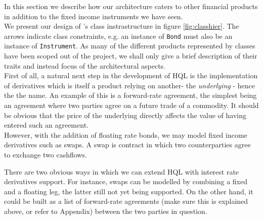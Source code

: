 In this section we describe how our architecture caters to other financial 
products in addition to the fixed income instruments we have seen.\\

We present our design of \hql's class instrastructure in figure \ref{fig:classhier}.
The arrows indicate class constraints, e.g. an instance of \texttt{Bond}
must also be an instance of \texttt{Instrument}. As many of the different
products represented by classes have been scoped out of the project, we shall only
give a brief description of their traits and instead focus of the architectural
aspects.\\

First of all, a natural next step in the development of HQL is the 
implementation of derivatives which is itself a product relying on another- the 
\emph{underlying} - hence the the name. An example of this is 
a forward-rate agreement, the simplest being an agreement where two parties 
agree on a future trade of a commodity. It should be obvious that the price of 
the underlying directly affects the value of having entered such an agreement.\\

However, with the addition of floating rate bonds, we may model fixed income 
derivatives such as swaps. A swap is contract in which two counterparties agree 
to exchange two cashflows.



There are two obvious ways in which we can extend HQL with interest rate 
derivatives support. For instance, swaps can be modelled by combining a fixed 
and a floating leg, the latter still not yet being supported. On the other 
hand, it could be built as a list of forward-rate agreements (make sure this is 
explained above, or refer to Appendix) between the two parties in question.
